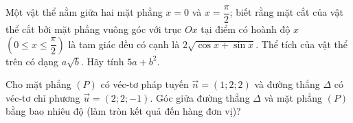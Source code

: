 \begin{ex}%
	Một vật thể nằm giữa hai mặt phẳng $x = 0$ và $x = \dfrac{\pi}{2}$; biết rằng mặt cắt của vật thể cắt bởi mặt phẳng vuông góc với trục $Ox$ tại điểm có hoành độ $x$ $\left(0 \leq x \leq \dfrac{\pi}{2}\right)$ là tam giác đều có cạnh là $2\sqrt{\cos x + \sin x}$. Thể tích của vật thể trên có dạng $a\sqrt{b}$. Hãy tính $5a + b^2$.
	\end{ex}

\begin{ex}%
Cho mặt phẳng $(P)$ có véc-tơ pháp tuyến $\overrightarrow{n}=(1 ; 2 ; 2)$ và đường thẳng $\Delta$ có véc-tơ chỉ phương $\overrightarrow{u}=(2 ; 2 ;-1)$. Góc giữa đường thẳng $\Delta$ và mặt phẳng $(P)$ bằng bao nhiêu độ (làm tròn kết quả đến hàng đơn vị)?
\end{ex}

